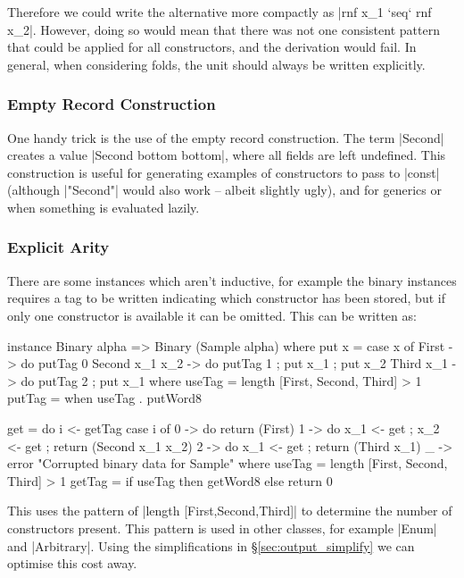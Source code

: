 \documentclass[preprint,draft]{sigplanconf}
\begin{document}
Therefore we could write the alternative more compactly as |rnf x_1 `seq` rnf x_2|. However, doing so would mean that there was not one consistent pattern that could be applied for all constructors, and the derivation would fail. In general, when considering folds, the unit should always be written explicitly.

\subsubsection{Empty Record Construction}

One handy trick is the use of the empty record construction. The term |Second{}| creates a value |Second bottom bottom|, where all fields are left undefined. This construction is useful for generating examples of constructors to pass to |const| (although |"Second"| would also work -- albeit slightly ugly), and for generics or when something is evaluated lazily.

\subsubsection{Explicit Arity}
\label{sec:explicit_arity}

There are some instances which aren't inductive, for example the binary instances requires a tag to be written indicating which constructor has been stored, but if only one constructor is available it can be omitted. This can be written as:

\begin{code}
instance Binary alpha => Binary (Sample alpha) where
    put x = case x of
        First            -> do putTag 0
        Second  x_1 x_2  -> do putTag 1 ; put x_1 ; put x_2
        Third   x_1      -> do putTag 2 ; put x_1
        where
            useTag = length [First{}, Second{}, Third{}] > 1
            putTag = when useTag . putWord8

    get = do
        i <- getTag
        case i of
            0 -> do return (First)
            1 -> do x_1 <- get ; x_2 <- get ; return (Second x_1 x_2)
            2 -> do x_1 <- get ; return (Third x_1)
            _ -> error "Corrupted binary data for Sample"
        where
            useTag = length [First{}, Second{}, Third{}] > 1
            getTag = if useTag then getWord8 else return 0
\end{code}

This uses the pattern of |length [First{},Second{},Third{}]| to determine the number of constructors present. This pattern is used in other classes, for example |Enum| and |Arbitrary|. Using the simplifications in \S\ref{sec:output_simplify} we can optimise this cost away.
\end{document}
